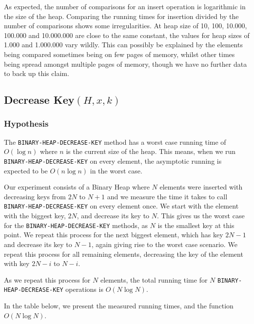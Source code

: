 \documentclass[a4paper,oneside,11pt]{article}
\begin{document}
\begin{itemize}
As expected, the number of comparisons for an insert operation is logarithmic in the size of the heap. Comparing the running times for insertion divided by the number of comparisons shows some irregularities. At heap size of 10, 100, 10.000, 100.000 and 10.000.000 are close to the same constant, the values for heap sizes of 1.000 and 1.000.000 vary wildly. This can possibly be explained by the elements being compared sometimes being on few pages of memory, whilst other times being spread amongst multiple pages of memory, though we have no further data to back up this claim.
\subsection*{Decrease Key$(H,x,k)$}
\subsubsection*{Hypothesis}
The \texttt{BINARY\--HEAP\--DECREASE\--KEY} method has a worst case running time of $O(\log n)$ where $n$ is the current size of the heap.
This means, when we run \texttt{BINARY\--HEAP\--DECREASE\--KEY} on every element, the asymptotic running is expected to be $O(n\log n)$ in the worst case.

Our experiment consists of a Binary Heap where $N$ elements were inserted with decreasing keys from $2N$ to $N+1$ and we measure the time it takes to call \texttt{BINARY\--HEAP\--DECREASE\--KEY} on every element once. We start with the element with the biggest key, $2N$, and decrease its key to $N$. This gives us the worst case for the \texttt{BINARY\--HEAP\--DECREASE\--KEY} methods, as $N$ is the smallest key at this point. We repeat this process for the next biggest element, which has key $2N-1$ and decrease its key to $N-1$, again giving rise to the worst case scenario. We repeat this process for all remaining elements, decreasing the key of the element with key $2N-i$ to $N-i$.

As we repeat this process for $N$ elements, the total running time for $N$ \texttt{BINARY\--HEAP\--DECREASE\--KEY} operations is $O(N\log N)$.

In the table below, we present the measured running times, and the function $O(N\log N)$.

\end{itemize}
\end{document}
